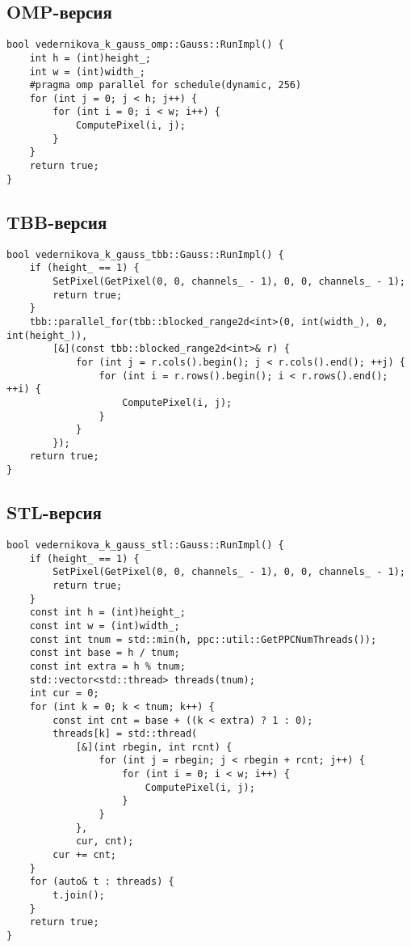 \documentclass[a4paper,12pt]{article}
\begin{document}
\subsection*{OMP-версия}
\begin{verbatim}
bool vedernikova_k_gauss_omp::Gauss::RunImpl() {
    int h = (int)height_;
    int w = (int)width_;
    #pragma omp parallel for schedule(dynamic, 256)
    for (int j = 0; j < h; j++) {
        for (int i = 0; i < w; i++) {
            ComputePixel(i, j);
        }
    }
    return true;
}
\end{verbatim}

\subsection*{TBB-версия}
\begin{verbatim}
bool vedernikova_k_gauss_tbb::Gauss::RunImpl() {
    if (height_ == 1) {
        SetPixel(GetPixel(0, 0, channels_ - 1), 0, 0, channels_ - 1);
        return true;
    }
    tbb::parallel_for(tbb::blocked_range2d<int>(0, int(width_), 0, int(height_)),
        [&](const tbb::blocked_range2d<int>& r) {
            for (int j = r.cols().begin(); j < r.cols().end(); ++j) {
                for (int i = r.rows().begin(); i < r.rows().end(); ++i) {
                    ComputePixel(i, j);
                }
            }
        });
    return true;
}
\end{verbatim}

\subsection*{STL-версия}
\begin{verbatim}
bool vedernikova_k_gauss_stl::Gauss::RunImpl() {
    if (height_ == 1) {
        SetPixel(GetPixel(0, 0, channels_ - 1), 0, 0, channels_ - 1);
        return true;
    }
    const int h = (int)height_;
    const int w = (int)width_;
    const int tnum = std::min(h, ppc::util::GetPPCNumThreads());
    const int base = h / tnum;
    const int extra = h % tnum;
    std::vector<std::thread> threads(tnum);
    int cur = 0;
    for (int k = 0; k < tnum; k++) {
        const int cnt = base + ((k < extra) ? 1 : 0);
        threads[k] = std::thread(
            [&](int rbegin, int rcnt) {
                for (int j = rbegin; j < rbegin + rcnt; j++) {
                    for (int i = 0; i < w; i++) {
                        ComputePixel(i, j);
                    }
                }
            },
            cur, cnt);
        cur += cnt;
    }
    for (auto& t : threads) {
        t.join();
    }
    return true;
}
\end{verbatim}
\end{document}

